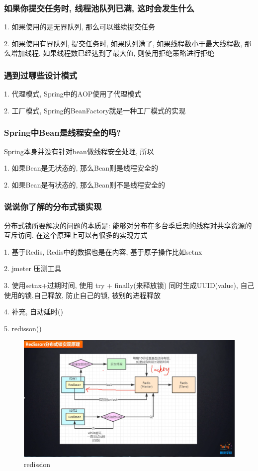 \subsubsection{如果你提交任务时, 线程池队列已满, 这时会发生什么}
1. 如果使用的是无界队列, 那么可以继续提交任务 \par
2. 如果使用有界队列, 提交任务时, 如果队列满了, 如果线程数小于最大线程数, 那么增加线程, 如果线程数已经达到了最大值, 则使用拒绝策略进行拒绝 \par
\subsubsection{遇到过哪些设计模式}
1. 代理模式, Spring中的AOP使用了代理模式 \par
2. 工厂模式, Spring的BeanFactory就是一种工厂模式的实现 \par
\subsubsection{Spring中Bean是线程安全的吗?}
Spring本身并没有针对bean做线程安全处理, 所以 \par
1. 如果Bean是无状态的, 那么Bean则是线程安全的 \par
2. 如果Bean是有状态的, 那么Bean则不是线程安全的

\subsubsection{说说你了解的分布式锁实现}
分布式锁所要解决的问题的本质是: 能够对分布在多台季启忠的线程对共享资源的互斥访问. 在这个原理上可以有很多的实现方式 \par
1. 基于Redis, Redis中的数据也是在内容, 基于原子操作比如setnx \par
2. jmeter 压测工具 \par
3. 使用setnx+过期时间, 使用 try + finally(来释放锁) 同时生成UUID(value), 自己使用的锁,自己释放, 防止自己的锁, 被别的进程释放 \par
4. 补充, 自动延时() \par
5. redisson() \par
\begin{figure}
	\centering
	\includegraphics[width=0.7\linewidth]{figures/redission.png}
	\caption{redission}
	\label{fig:redission}
\end{figure}
